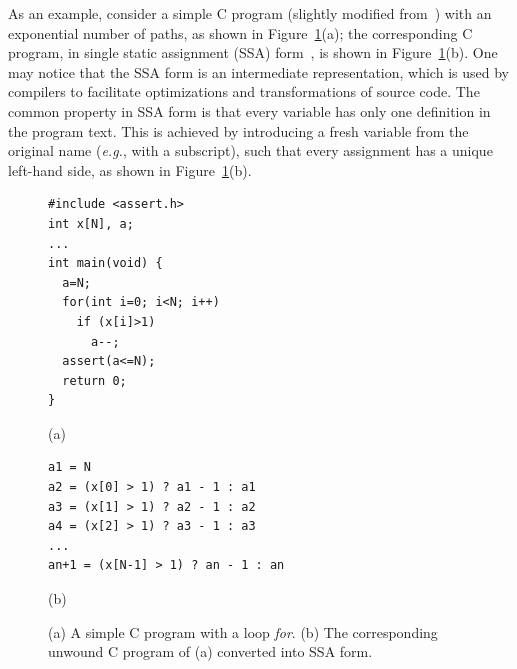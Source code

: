 \documentclass[format=acmsmall, review=false, screen=true]{acmart}
\begin{document}
As an example, consider a simple C program (slightly modified from~\cite{Strichman08}) with an exponential number of paths, as shown in Figure~\ref{figure:verification-condition}(a); the corresponding C program, in single static assignment (SSA) form~\cite{Appel97}, is shown in Figure~\ref{figure:verification-condition}(b). One may notice that the SSA form is an intermediate representation, which is used by compilers to facilitate optimizations and transformations of source code. The common property in SSA form is that every variable has only one definition in the program text. This is achieved by introducing a fresh variable from the original name ({\it e.g.}, with a subscript), such that every assignment has a unique left-hand side, as shown in Figure~\ref{figure:verification-condition}(b).
%
\begin{figure}[ht]
\centering
\begin{minipage}{0.45\textwidth}
\begin{lstlisting}
#include <assert.h>
int x[N], a;
...
int main(void) {
  a=N;
  for(int i=0; i<N; i++)
    if (x[i]>1)
      a--;
  assert(a<=N);
  return 0;
}
\end{lstlisting}
\end{minipage}
\begin{center}
(a)
\end{center}
\centering
\begin{minipage}{0.45\textwidth}
\begin{lstlisting}
a1 = N
a2 = (x[0] > 1) ? a1 - 1 : a1
a3 = (x[1] > 1) ? a2 - 1 : a2
a4 = (x[2] > 1) ? a3 - 1 : a3
...
an+1 = (x[N-1] > 1) ? an - 1 : an 
\end{lstlisting}
\end{minipage}
\begin{center}
(b)
\end{center}
\caption{(a) A simple C program with a loop \textit{for}. (b) The corresponding unwound C program of (a) converted into SSA form.} 
\label{figure:verification-condition}
\end{figure}
\end{document}
